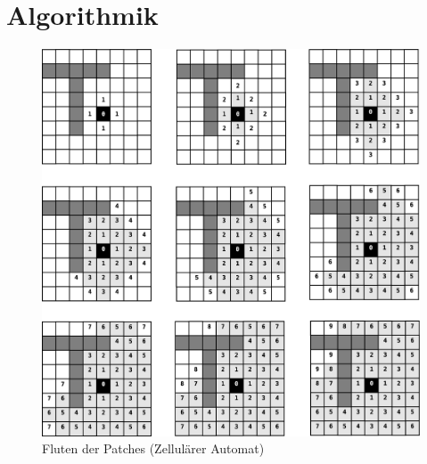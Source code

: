 \chapter{Algorithmik}
\label{cha:algorithmik}


\begin{figure}
\centering
\includegraphics[height=0.9\textwidth]{algorithmik/flooding.eps}
\caption{Fluten der Patches (Zellulärer Automat)}
\label{fig:flooding}
\end{figure}